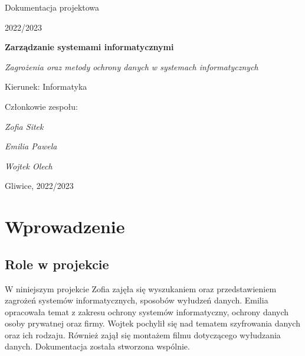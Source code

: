 \documentclass[12pt,a4paper]{article}
\begin{document}
\clearpage
\begin{figure}[h]
\centering
\end{figure}
\hspace{3cm}
\begin{center}Dokumentacja projektowa\end{center}
\begin{center}2022/2023\end{center}
\hspace{3cm}
\begin{center}\large\textbf{Zarządzanie systemami informatycznymi}\end{center}
\begin{center}\large\textit{Zagrożenia oraz metody ochrony danych w systemach informatycznych}\end{center}

\hspace{7cm}
\begin{flushright}Kierunek: Informatyka
\end{flushright}
\begin{flushright}Członkowie zespołu:
\par
\textit{Zofia Sitek}
\par
\textit{Emilia Pawela}
\par
\textit{Wojtek Olech}
\end{flushright}
\vfill
\begin{center}Gliwice, 2022/2023\end{center}

\newpage
{}
\tableofcontents

\newpage
\section{Wprowadzenie}










\subsection{Role w projekcie}
W niniejszym projekcie Zofia zajęła się wyszukaniem oraz przedstawieniem zagrożeń systemów informatycznych, sposobów wyłudzeń danych. Emilia opracowała temat z zakresu ochrony systemów informatyczny, ochrony danych osoby prywatnej oraz firmy. Wojtek pochylił się nad tematem szyfrowania danych oraz ich rodzaju. Również zajął się montażem filmu dotyczącego wyłudzania danych. Dokumentacja została stworzona wspólnie. 
\end{document}
